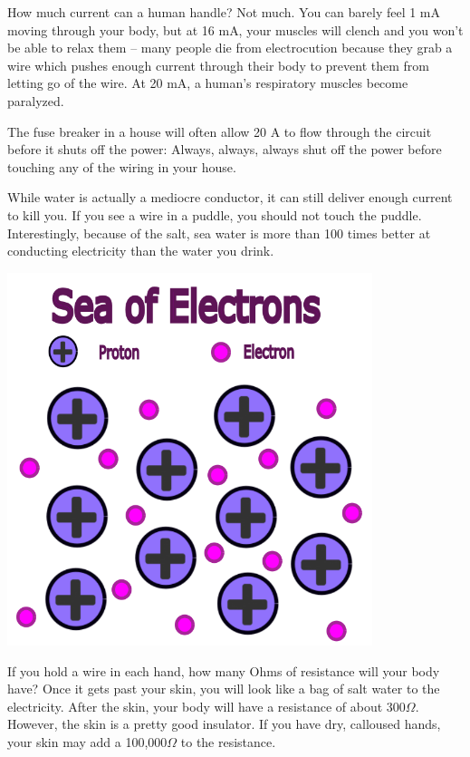 How much current can a human handle? Not much. You can barely feel 1
mA moving through your body, but at 16 mA, your muscles will clench
and you won't be able to relax them -- many people die from
electrocution because they grab a wire which pushes enough current
through their body to prevent them from letting go of the wire.  At 20
mA, a human's respiratory muscles become paralyzed.

The fuse breaker in a house will often allow 20 A to flow through the
circuit before it shuts off the power: Always, always, always shut off
the power before touching any of the wiring in your house.

While water is actually a mediocre conductor, it can still deliver enough current
to kill you. If you see a wire in a puddle, you should not touch the
puddle. Interestingly, because of the salt, sea water is more than
100 times better at conducting electricity than the water you drink.

\includegraphics[width=0.8\textwidth]{Sea_Electrons.png}

If you hold a wire in each hand, how many Ohms of resistance will your
body have? Once it gets past your skin, you will look like a bag of
salt water to the electricity. After the skin, your body will have a
resistance of about 300$\Omega$. However, the skin is a pretty good
insulator. If you have dry, calloused hands, your skin may add a
100,000$\Omega$ to the resistance.


